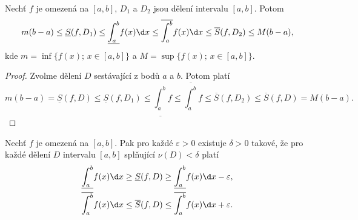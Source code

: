 \begin{dusledek}\label{dusledek8.11}
Nechť $f$ je omezená na $[a,b]$, $D_1$ a $D_2$ jsou dělení intervalu $[a,b]$. Potom
\[
m(b-a) \le \underline{S}(f,D_1) \le \underline{\int_a^b} f(x)\d x
\le \overline{\int_a^b} f(x)\d x \le \overline{S}(f,D_2) \le M(b-a),
\]
kde $m = \inf\{f(x);\, x \in [a,b]\}$ a $M = \sup\{f(x);\, x \in [a,b]\}$.
\end{dusledek}

\begin{proof}
	Zvolme dělení $D$ sestávající z bodů $a$ a $b$. Potom platí
	$$
	    m(b-a) = \underline{S}(f,D)\leq \underline{S}(f,D_1) \leq \underline{\int_a^b}f \leq \overline{\int_a^b}f \leq \overline{S}(f,D_2) \leq \overline{S}(f,D)=M(b-a).
	$$
\end{proof}

\begin{veta}\label{veta8.12}
Nechť $f$ je omezená na $[a,b]$. Pak pro každé $\varepsilon > 0$ existuje $\delta > 0$ takové, že pro každé dělení $D$ intervalu $[a,b]$ splňující $\nu(D) < \delta$ platí
\begin{align*}
	&\underline{\int_a^b} f(x)\d x \ge \underline{S}(f,D) \ge \underline{\int_a^b} f(x)\d x - \varepsilon,\\
&	\overline{\int_a^b} f(x)\d x \le \overline{S}(f,D) \le \overline{\int_a^b} f(x)\d x + \varepsilon.
\end{align*}
\end{veta}

